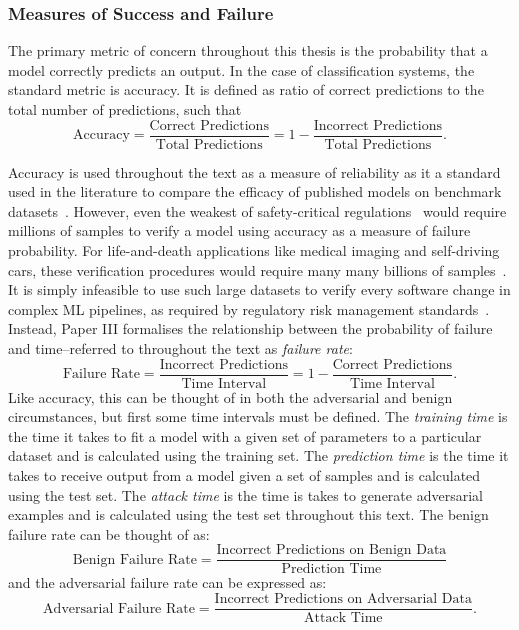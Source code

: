 \subsubsection{Measures of Success and Failure}
The primary metric of concern throughout this thesis is the probability that a model correctly predicts an output. 
In the case of classification systems, the standard metric is accuracy. 
It is defined as ratio of correct predictions to the total number of predictions, such that
$$
\text{Accuracy} =  \frac{\text{Correct~Predictions}}{\text{Total~Predictions}} = 1 - \frac{\text{Incorrect~Predictions}}{\text{Total~Predictions}}.
$$

Accuracy is used throughout the text as a measure of reliability as it a standard used in the literature to compare the efficacy of published models on benchmark datasets~\cite{croce_reliable_2020}. 
However, even the weakest of safety-critical regulations~\cite{IEC61508} would require millions of samples to verify a model using accuracy as a measure of failure probability. 
For life-and-death applications like medical imaging and self-driving cars, these verification procedures would require many many billions of samples~\cite{IEC61508}. 
It is simply infeasible to use such large datasets to verify every software change in complex ML pipelines, as required by regulatory risk management standards~\cite{IEC61508}. 
Instead, Paper III formalises the relationship between the probability of failure and time--referred to throughout the text as \textit{failure rate}:
$$
\text{Failure~Rate} = \frac{\text{Incorrect~Predictions}}{\text{Time~Interval}} = 1 - \frac{\text{Correct~Predictions}}{\text{Time~Interval}}.
$$
Like accuracy, this can be thought of in both the adversarial and benign circumstances, but first some time intervals must be defined. 
The \textit{training time} is the time it takes to fit a model with a given set of parameters to a particular dataset and is calculated using the training set. 
The \textit{prediction time} is the time it takes to receive output from a model given a set of samples and is calculated using the test set. 
The \textit{attack time} is the time is takes to generate adversarial examples and is calculated using the test set throughout this text.
The benign failure rate can be thought of as:
$$
\text{Benign~Failure~Rate} = \frac{\text{Incorrect~Predictions~on~Benign~Data}}{\text{Prediction~Time}} 
$$
and the adversarial failure rate can be expressed as:
$$
\text{Adversarial~Failure~Rate} = \frac{\text{Incorrect~Predictions~on~Adversarial~Data}}{\text{Attack~Time}}.
$$
